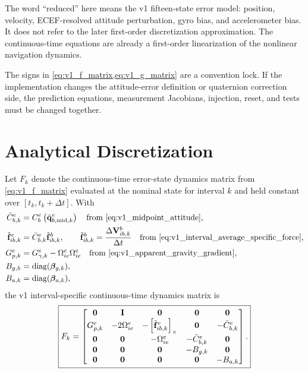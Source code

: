 The word ``reduced'' here means the v1 fifteen-state error model: position,
velocity, ECEF-resolved attitude perturbation, gyro bias, and accelerometer
bias. It does not refer to the later first-order discretization approximation.
The continuous-time equations are already a first-order linearization of the
nonlinear navigation dynamics.

\begin{warningbox}
The signs in \cref{eq:v1_f_matrix,eq:v1_g_matrix} are a convention lock. If
the implementation changes the attitude-error definition or quaternion
correction side, the prediction equations, measurement Jacobians, injection,
reset, and tests must be changed together.
\end{warningbox}

\section{Analytical Discretization}

Let $F_k$ denote the continuous-time error-state dynamics matrix from
\cref{eq:v1_f_matrix} evaluated at the nominal state for interval $k$ and held
constant over $[t_k,t_k+\Delta t]$.
With
\begin{align}
\bar C_{b,k}^{e} &= C_b^e\left(\hat{\quat}_{b,\mathrm{mid},k}^{e}\right)
\quad\text{from \cref{eq:v1_midpoint_attitude}},\\
\hat{\fb}_{ib,k}^{e} &= \bar C_{b,k}^{e}\hat{\fb}_{ib,k}^{b},
\qquad
\hat{\fb}_{ib,k}^{b}
=
\frac{\Delta\mathbf{V}_{ib,k}^{b}}{\Delta t}
\quad\text{from \cref{eq:v1_interval_average_specific_force}},\\
G_{p,k}^{e} &=
G_{\gamma,k}^{e}
-
\Omega_{ie}^{e}\Omega_{ie}^{e}
\quad\text{from \cref{eq:v1_apparent_gravity_gradient}},\\
B_{g,k} &= \operatorname{diag}(\boldsymbol{\beta}_{g,k}),\\
B_{a,k} &= \operatorname{diag}(\boldsymbol{\beta}_{a,k}),
\end{align}
the v1 interval-specific continuous-time dynamics matrix is
\begin{equation}
\boxed{
F_k =
\begin{bmatrix}
\mathbf{0} & \mathbf{I} & \mathbf{0} & \mathbf{0} & \mathbf{0}\\
G_{p,k}^{e} & -2\Omega_{ie}^{e} & -\left[\hat{\mathbf{f}}_{ib,k}^{e}\right]_{\times} & \mathbf{0} & -\bar C_{b,k}^{e}\\
\mathbf{0} & \mathbf{0} & -\Omega_{ie}^{e} & -\bar C_{b,k}^{e} & \mathbf{0}\\
\mathbf{0} & \mathbf{0} & \mathbf{0} & -B_{g,k} & \mathbf{0}\\
\mathbf{0} & \mathbf{0} & \mathbf{0} & \mathbf{0} & -B_{a,k}
\end{bmatrix}.
}
\label{eq:v1_fk_matrix}
\end{equation}


